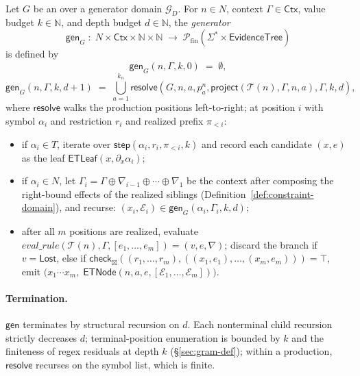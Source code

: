 \begin{definition}[Generator]
\label{def:gen}
Let \(G\) be an \spg{} over a generator domain \(\mathcal{G}_D\). For
\(n \in N\), context \(\Gamma \in \mathsf{Ctx}\), value budget
\(k \in \mathbb{N}\), and depth budget \(d \in \mathbb{N}\), the
\emph{generator}
\[
  \mathsf{gen}_G \;:\; N \times \mathsf{Ctx} \times \mathbb{N} \times \mathbb{N}
  \;\to\;
  \mathcal{P}_{\!\!\text{fin}}(\Sigma^\ast \times \mathsf{EvidenceTree})
\]
is defined by
\[
  \mathsf{gen}_G(n, \Gamma, k, 0) \;=\; \emptyset,
\]
\[
  \mathsf{gen}_G(n, \Gamma, k, d+1)
  \;=\;
  \bigcup_{a=1}^{k_n} \mathsf{resolve}(G, n, a, p_a^n, \mathsf{project}(\mathcal{T}(n), \Gamma, n, a), \Gamma, k, d),
\]
where \(\mathsf{resolve}\) walks the production positions left-to-right; at
position \(i\) with symbol \(\alpha_i\) and restriction \(r_i\) and realized
prefix \(\pi_{<i}\):
\begin{itemize}[nosep]
  \item if \(\alpha_i \in T\), iterate over
    \(\mathsf{step}(\alpha_i, r_i, \pi_{<i}, k)\) and record each candidate
    \((x, e)\) as the leaf \(\mathsf{ETLeaf}(x, \partial_x \alpha_i)\);
  \item if \(\alpha_i \in N\), let
    \(\Gamma_i = \Gamma \oplus \nabla_{i-1} \oplus \cdots \oplus \nabla_1\)
    be the context after composing the right-bound effects of the realized
    siblings (Definition~\ref{def:constraint-domain}), and recurse:
    \((x_i, \mathcal{E}_i) \in \mathsf{gen}_G(\alpha_i, \Gamma_i, k, d)\);
  \item after all \(m\) positions are realized, evaluate
    \(\mathit{eval\_rule}(\mathcal{T}(n), \Gamma, [e_1, \ldots, e_m]) = (v, e, \nabla)\);
    discard the branch if \(v = \mathsf{Lost}\), else if
    \(\mathsf{check}_\boxtimes((r_1,\ldots,r_m), ((x_1, e_1),\ldots,(x_m, e_m))) =
    \top\), emit
    \(\bigl(x_1 \cdots x_m,\; \mathsf{ETNode}(n, a, e, [\mathcal{E}_1,\ldots,\mathcal{E}_m])\bigr)\).
\end{itemize}
\end{definition}

\paragraph{Termination.}
\(\mathsf{gen}\) terminates by structural recursion on \(d\). Each
nonterminal child recursion strictly decreases \(d\); terminal-position
enumeration is bounded by \(k\) and the finiteness of regex residuals at
depth \(k\) (\S\ref{sec:gram-def}); within a production, \(\mathsf{resolve}\)
recurses on the symbol list, which is finite.

